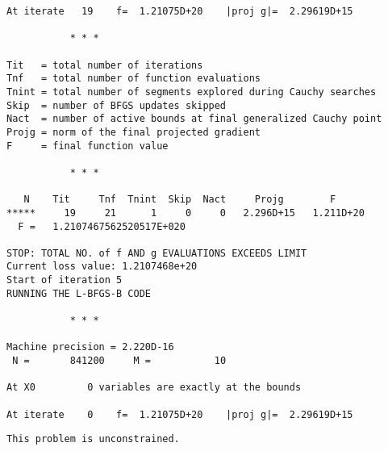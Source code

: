 \documentclass[11pt]{article}
\begin{document}
\begin{Verbatim}[commandchars=\\\{\}]
At iterate   19    f=  1.21075D+20    |proj g|=  2.29619D+15

           * * *

Tit   = total number of iterations
Tnf   = total number of function evaluations
Tnint = total number of segments explored during Cauchy searches
Skip  = number of BFGS updates skipped
Nact  = number of active bounds at final generalized Cauchy point
Projg = norm of the final projected gradient
F     = final function value

           * * *

   N    Tit     Tnf  Tnint  Skip  Nact     Projg        F
*****     19     21      1     0     0   2.296D+15   1.211D+20
  F =   1.2107467562520517E+020

STOP: TOTAL NO. of f AND g EVALUATIONS EXCEEDS LIMIT
Current loss value: 1.2107468e+20
Start of iteration 5
RUNNING THE L-BFGS-B CODE

           * * *

Machine precision = 2.220D-16
 N =       841200     M =           10

At X0         0 variables are exactly at the bounds

At iterate    0    f=  1.21075D+20    |proj g|=  2.29619D+15
    \end{Verbatim}

    \begin{Verbatim}[commandchars=\\\{\}]
 This problem is unconstrained.
    \end{Verbatim}
\end{document}
